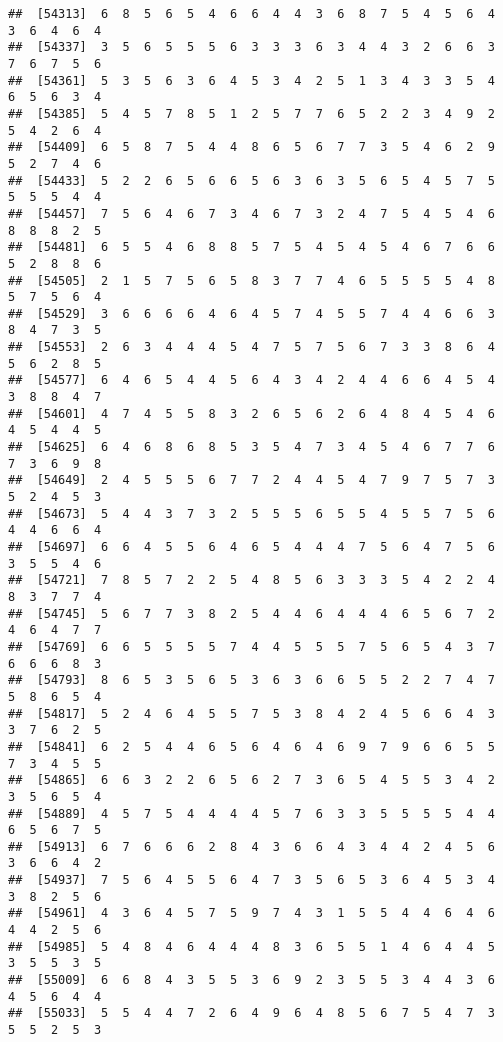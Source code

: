 \documentclass[
]{book}
\begin{document}
\begin{verbatim}
##  [54313]  6  8  5  6  5  4  6  6  4  4  3  6  8  7  5  4  5  6  4  3  6  4  6  4
##  [54337]  3  5  6  5  5  5  6  3  3  3  6  3  4  4  3  2  6  6  3  7  6  7  5  6
##  [54361]  5  3  5  6  3  6  4  5  3  4  2  5  1  3  4  3  3  5  4  6  5  6  3  4
##  [54385]  5  4  5  7  8  5  1  2  5  7  7  6  5  2  2  3  4  9  2  5  4  2  6  4
##  [54409]  6  5  8  7  5  4  4  8  6  5  6  7  7  3  5  4  6  2  9  5  2  7  4  6
##  [54433]  5  2  2  6  5  6  6  5  6  3  6  3  5  6  5  4  5  7  5  5  5  5  4  4
##  [54457]  7  5  6  4  6  7  3  4  6  7  3  2  4  7  5  4  5  4  6  8  8  8  2  5
##  [54481]  6  5  5  4  6  8  8  5  7  5  4  5  4  5  4  6  7  6  6  5  2  8  8  6
##  [54505]  2  1  5  7  5  6  5  8  3  7  7  4  6  5  5  5  5  4  8  5  7  5  6  4
##  [54529]  3  6  6  6  6  4  6  4  5  7  4  5  5  7  4  4  6  6  3  8  4  7  3  5
##  [54553]  2  6  3  4  4  4  5  4  7  5  7  5  6  7  3  3  8  6  4  5  6  2  8  5
##  [54577]  6  4  6  5  4  4  5  6  4  3  4  2  4  4  6  6  4  5  4  3  8  8  4  7
##  [54601]  4  7  4  5  5  8  3  2  6  5  6  2  6  4  8  4  5  4  6  4  5  4  4  5
##  [54625]  6  4  6  8  6  8  5  3  5  4  7  3  4  5  4  6  7  7  6  7  3  6  9  8
##  [54649]  2  4  5  5  5  6  7  7  2  4  4  5  4  7  9  7  5  7  3  5  2  4  5  3
##  [54673]  5  4  4  3  7  3  2  5  5  5  6  5  5  4  5  5  7  5  6  4  4  6  6  4
##  [54697]  6  6  4  5  5  6  4  6  5  4  4  4  7  5  6  4  7  5  6  3  5  5  4  6
##  [54721]  7  8  5  7  2  2  5  4  8  5  6  3  3  3  5  4  2  2  4  8  3  7  7  4
##  [54745]  5  6  7  7  3  8  2  5  4  4  6  4  4  4  6  5  6  7  2  4  6  4  7  7
##  [54769]  6  6  5  5  5  5  7  4  4  5  5  5  7  5  6  5  4  3  7  6  6  6  8  3
##  [54793]  8  6  5  3  5  6  5  3  6  3  6  6  5  5  2  2  7  4  7  5  8  6  5  4
##  [54817]  5  2  4  6  4  5  5  7  5  3  8  4  2  4  5  6  6  4  3  3  7  6  2  5
##  [54841]  6  2  5  4  4  6  5  6  4  6  4  6  9  7  9  6  6  5  5  7  3  4  5  5
##  [54865]  6  6  3  2  2  6  5  6  2  7  3  6  5  4  5  5  3  4  2  3  5  6  5  4
##  [54889]  4  5  7  5  4  4  4  4  5  7  6  3  3  5  5  5  5  4  4  6  5  6  7  5
##  [54913]  6  7  6  6  6  2  8  4  3  6  6  4  3  4  4  2  4  5  6  3  6  6  4  2
##  [54937]  7  5  6  4  5  5  6  4  7  3  5  6  5  3  6  4  5  3  4  3  8  2  5  6
##  [54961]  4  3  6  4  5  7  5  9  7  4  3  1  5  5  4  4  6  4  6  4  4  2  5  6
##  [54985]  5  4  8  4  6  4  4  4  8  3  6  5  5  1  4  6  4  4  5  3  5  5  3  5
##  [55009]  6  6  8  4  3  5  5  3  6  9  2  3  5  5  3  4  4  3  6  4  5  6  4  4
##  [55033]  5  5  4  4  7  2  6  4  9  6  4  8  5  6  7  5  4  7  3  5  5  2  5  3

\end{verbatim}
\end{document}
